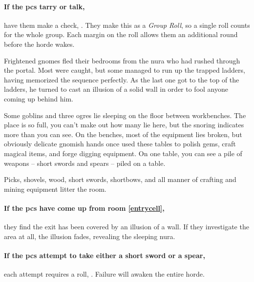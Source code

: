 \begin{multicols}{2}
\paragraph{If the \glspl{pc} tarry or talk,}
have them make a  check, \tn[6].
They make this as a \textit{Group Roll}, so a single roll counts for the whole group.
Each margin on the roll allows them an additional round before the horde wakes.


\label{laddertop}


\begin{exampletext}

  Frightened gnomes fled their bedrooms from the nura who had rushed through the portal.
  Most were caught, but some managed to run up the trapped ladders, having memorized the sequence perfectly.
  As the last one got to the top of the ladders, he turned to cast an illusion of a solid wall in order to fool anyone coming up behind him.

\end{exampletext}

\begin{boxtext}

  Some goblins and three ogres lie sleeping on the floor between workbenches.
  The place is so full, you can't make out how many lie here, but the snoring indicates more than you can see.
  On the benches, most of the equipment lies broken, but obviously delicate gnomish hands once used these tables to polish gems, craft magical items, and forge digging equipment.
  On one table, you can see a pile of weapons -- short swords and spears -- piled on a table.

\end{boxtext}
Picks, shovels, wood, short swords, shortbows, and all manner of crafting and mining equipment litter the room.

\paragraph{If the \glspl{pc} have come up from room \ref{entrycell},}
they find the exit has been covered by an illusion of a wall.
If they investigate the area at all, the illusion fades, revealing the sleeping nura.

\paragraph{If the \glspl{pc} attempt to take either a short sword or a spear,}
each attempt requires a  roll, \tn[7].
Failure will awaken the entire horde.


\end{multicols}
